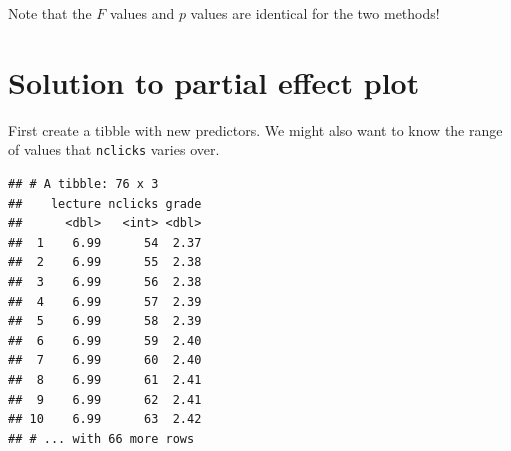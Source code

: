 \documentclass[]{book}
\newenvironment{Shaded}{\begin{snugshade}}{\end{snugshade}}
\newcommand{\CommentTok}[1]{\textcolor[rgb]{0.56,0.35,0.01}{\textit{#1}}}
\newcommand{\DataTypeTok}[1]{\textcolor[rgb]{0.13,0.29,0.53}{#1}}
\newcommand{\KeywordTok}[1]{\textcolor[rgb]{0.13,0.29,0.53}{\textbf{#1}}}
\newcommand{\NormalTok}[1]{#1}
\newcommand{\OperatorTok}[1]{\textcolor[rgb]{0.81,0.36,0.00}{\textbf{#1}}}
\newcommand{\StringTok}[1]{\textcolor[rgb]{0.31,0.60,0.02}{#1}}
\begin{document}
Note that the \(F\) values and \(p\) values are identical for the two methods!

\hypertarget{solution-to-partial-effect-plot}{%
\section{Solution to partial effect plot}\label{solution-to-partial-effect-plot}}

First create a tibble with new predictors. We might also want to know the range of values that \texttt{nclicks} varies over.

\begin{Shaded}
\end{Shaded}

\begin{verbatim}
## # A tibble: 76 x 3
##    lecture nclicks grade
##      <dbl>   <int> <dbl>
##  1    6.99      54  2.37
##  2    6.99      55  2.38
##  3    6.99      56  2.38
##  4    6.99      57  2.39
##  5    6.99      58  2.39
##  6    6.99      59  2.40
##  7    6.99      60  2.40
##  8    6.99      61  2.41
##  9    6.99      62  2.41
## 10    6.99      63  2.42
## # ... with 66 more rows
\end{verbatim}
\end{document}
